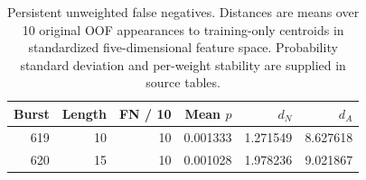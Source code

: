 \begin{table}[t]
\centering
\caption{Persistent unweighted false negatives. Distances are means over 10 original OOF appearances to training-only centroids in standardized five-dimensional feature space. Probability standard deviation and per-weight stability are supplied in source tables.}
\label{tab:fn}
\small
\begin{tabular}{rrrrrr}
\toprule
Burst & Length & FN / 10 & Mean $p$ & $d_N$ & $d_A$ \\
\midrule
619 & 10 & 10 & 0.001333 & 1.271549 & 8.627618 \\
620 & 15 & 10 & 0.001028 & 1.978236 & 9.021867 \\
\bottomrule
\end{tabular}
\end{table}
